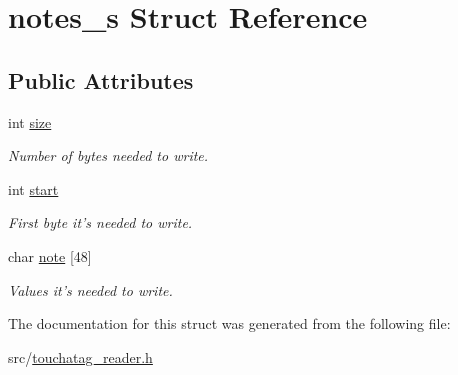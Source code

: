 \hypertarget{structnotes__s}{
\section{notes\_\-s Struct Reference}
\label{structnotes__s}
}
\subsection*{Public Attributes}
\begin{DoxyCompactItemize}
\item 
\hypertarget{structnotes__s_a288e093b3820341c1679e45ed26ec1b1}{
int \hyperlink{structnotes__s_a288e093b3820341c1679e45ed26ec1b1}{size}}
\label{structnotes__s_a288e093b3820341c1679e45ed26ec1b1}

\begin{DoxyCompactList}\small\item\em Number of bytes needed to write. \item\end{DoxyCompactList}\item 
\hypertarget{structnotes__s_a1745deaf68e90c6836566d076311f0b4}{
int \hyperlink{structnotes__s_a1745deaf68e90c6836566d076311f0b4}{start}}
\label{structnotes__s_a1745deaf68e90c6836566d076311f0b4}

\begin{DoxyCompactList}\small\item\em First byte it's needed to write. \item\end{DoxyCompactList}\item 
\hypertarget{structnotes__s_a5e5ce8c122ae345263341982dfa15d53}{
char \hyperlink{structnotes__s_a5e5ce8c122ae345263341982dfa15d53}{note} \mbox{[}48\mbox{]}}
\label{structnotes__s_a5e5ce8c122ae345263341982dfa15d53}

\begin{DoxyCompactList}\small\item\em Values it's needed to write. \item\end{DoxyCompactList}\end{DoxyCompactItemize}


The documentation for this struct was generated from the following file:\begin{DoxyCompactItemize}
\item 
src/\hyperlink{touchatag__reader_8h}{touchatag\_\-reader.h}\end{DoxyCompactItemize}
